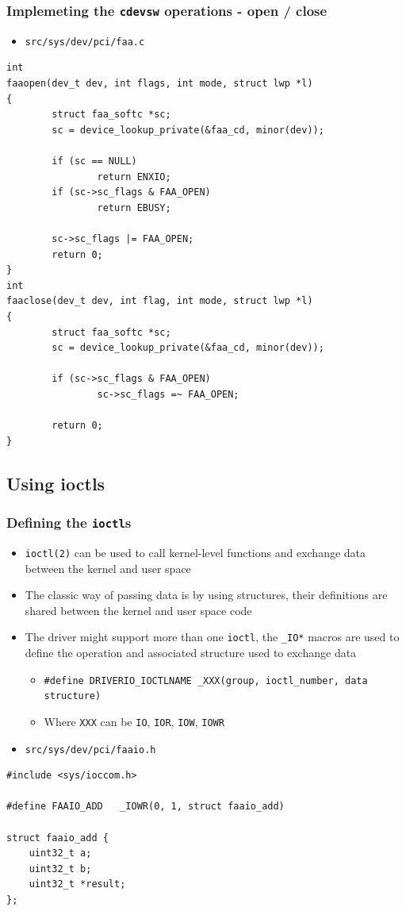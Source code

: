 \documentclass[dvipsnames,table]{beamer}
\begin{document}
\begin{frame}[fragile]
\frametitle{Implemeting the {\tt cdevsw} operations - open / close}
\begin{itemize}
	\item {\tt src/sys/dev/pci/faa.c}
\end{itemize}
\begin{lstlisting}
int
faaopen(dev_t dev, int flags, int mode, struct lwp *l)
{
        struct faa_softc *sc;
        sc = device_lookup_private(&faa_cd, minor(dev));

        if (sc == NULL)
                return ENXIO;
        if (sc->sc_flags & FAA_OPEN)
                return EBUSY;

        sc->sc_flags |= FAA_OPEN;
        return 0;
}
int
faaclose(dev_t dev, int flag, int mode, struct lwp *l)
{
        struct faa_softc *sc;
        sc = device_lookup_private(&faa_cd, minor(dev));

        if (sc->sc_flags & FAA_OPEN)
                sc->sc_flags =~ FAA_OPEN;

        return 0;
}
\end{lstlisting}
\end{frame}

\subsection{Using ioctls}

\begin{frame}[fragile]
\frametitle{Defining the {\tt ioctl}s}
\begin{itemize}
	\item {\tt ioctl(2)} can be used to call kernel-level functions and exchange data between the kernel and user space
	\item The classic way of passing data is by using structures, their definitions are shared between the kernel and user space code
	\item The driver might support more than one {\tt ioctl}, the {\tt \_IO*} macros are used to define the operation and associated structure used to exchange data
	\begin{itemize}

		\item {\tt \#define DRIVERIO\_IOCTLNAME	\_XXX(group, ioctl\_number, data structure)}
		\item Where {\tt XXX} can be {\tt IO}, {\tt IOR}, {\tt IOW}, {\tt IOWR}
	\end{itemize}
\end{itemize}

\begin{itemize}
\item {\tt src/sys/dev/pci/faaio.h}
\end{itemize}
\begin{lstlisting}
#include <sys/ioccom.h>
                     
#define FAAIO_ADD	_IOWR(0, 1, struct faaio_add)

struct faaio_add {
    uint32_t a;
    uint32_t b;
    uint32_t *result;
};
\end{lstlisting}

\end{frame}
\end{document}
